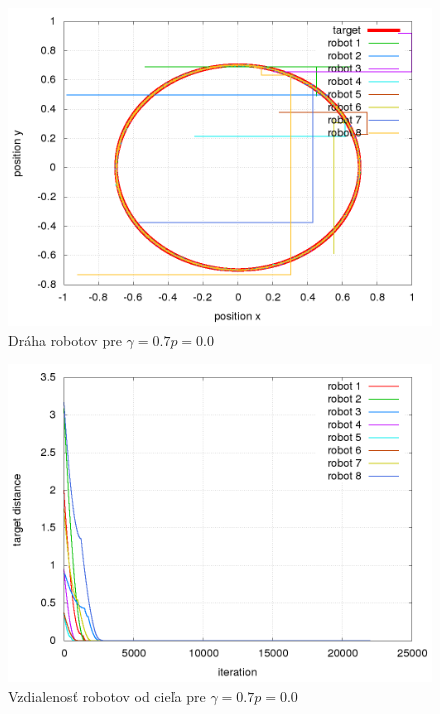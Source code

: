 \begin{figure}[!htb]
\centering
\includegraphics[scale=.4]{../../results_q_learning/nano_q_learning/result_00/robot_path.png}
\caption{Dráha robotov pre $\gamma = 0.7 p = 0.0$}
\label{img:nano_q_result_00_path}
\end{figure}

\begin{figure}[!htb]
\centering
\includegraphics[scale=.4]{../../results_q_learning/nano_q_learning/result_00/robot_reward.png}
\caption{Vzdialenosť robotov od cieľa pre $\gamma = 0.7 p = 0.0$}
\label{img:nano_q_result_00_error}
\end{figure}




